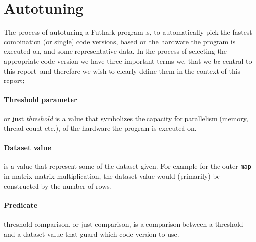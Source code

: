 \section{Autotuning}
The process of autotuning a Futhark program is, to automatically pick the fastest combination (or single) code versions, based on the hardware the program is executed on, and some representative data. In the process of selecting the appropriate code version we have three important terms we, that we be central to this report, and therefore we wish to clearly define them in the context of this report;	
\paragraph{Threshold parameter} or just \textit{threshold} is a value that symbolizes the capacity for parallelism (memory, thread count etc.), of the hardware the program is executed on.
\paragraph{Dataset value} is a value that represent some of the dataset given. For example for the outer \texttt{map} in matrix-matrix multiplication, the dataset value would (primarily) be constructed by the number of rows.
\paragraph{Predicate} threshold comparison, or just comparison, is a comparison between a threshold and a dataset value that guard which code version to use. \\

